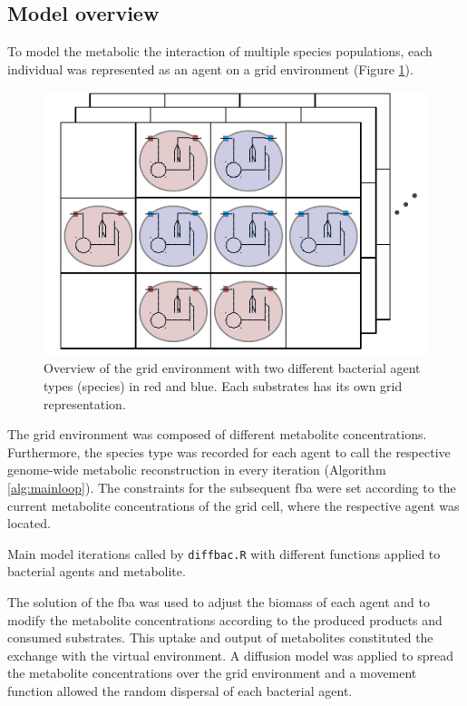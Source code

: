 \subsection{Model overview}
To model the metabolic the interaction of multiple species populations, each individual was represented as an agent on a grid environment (Figure \hyperref[fig:bacarena]{\ref{fig:bacarena}}).
\begin{figure}[h!]\centering
\includegraphics[scale=1.4]{method_chart_BacArena.pdf}
\caption[Overview BacArena]{Overview of the grid environment with two different bacterial agent types (species) in red and blue. Each substrates has its own grid representation.}
\label{fig:bacarena}
\end{figure}
The grid environment was composed of different metabolite concentrations. Furthermore, the species type was recorded for each agent to call the respective genome-wide metabolic reconstruction in every iteration (Algorithm \hyperref[alg:mainloop]{\ref{alg:mainloop}}). The constraints for the subsequent fba were set according to the current metabolite concentrations of the grid cell, where the respective agent was located.
\begin{algorithm}
\caption{Main model iterations called by \texttt{diffbac.R} with different functions applied to bacterial agents and metabolite.}
\SetAlgoLined
{}
\label{alg:mainloop}
\end{algorithm}
The solution of the fba was used to adjust the biomass of each agent and to modify the metabolite concentrations according to the produced products and consumed substrates. 
This uptake and output of metabolites constituted the exchange with the virtual environment.
A diffusion model was applied to spread the metabolite concentrations over the grid environment and a movement function allowed the random dispersal of each bacterial agent.

